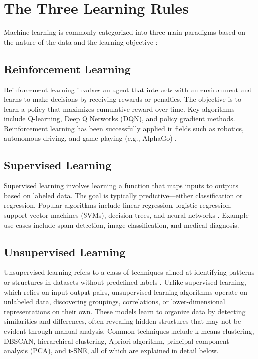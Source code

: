 \documentclass[conference]{IEEEtran}
\begin{document}
\section{The Three Learning Rules}
Machine learning is commonly categorized into three main paradigms based on the nature of the data and the learning objective \cite{unsupervised}: 

\subsection{Reinforcement Learning}
Reinforcement learning involves an agent that interacts with an environment and learns to make decisions by receiving rewards or penalties. The objective is to learn a policy that maximizes cumulative reward over time. Key algorithms include Q-learning, Deep Q Networks (DQN), and policy gradient methods. Reinforcement learning has been successfully applied in fields such as robotics, autonomous driving, and game playing (e.g., AlphaGo) \cite{Hui_2018}.

\subsection{Supervised Learning}
Supervised learning involves learning a function that maps inputs to outputs based on labeled data. The goal is typically predictive—either classification or regression. Popular algorithms include linear regression, logistic regression, support vector machines (SVMs), decision trees, and neural networks \cite{supervised}. Example use cases include spam detection, image classification, and medical diagnosis.

\subsection{Unsupervised Learning}
Unsupervised learning refers to a class of techniques aimed at identifying patterns or structures in datasets without predefined labels \cite{unsupervised}. Unlike supervised learning, which relies on input-output pairs, unsupervised learning algorithms operate on unlabeled data, discovering groupings, correlations, or lower-dimensional representations on their own. These models learn to organize data by detecting similarities and differences, often revealing hidden structures that may not be evident through manual analysis. Common techniques include k-means clustering, DBSCAN, hierarchical clustering, Apriori algorithm, principal component analysis (PCA), and t-SNE, all of which are explained in detail below. 
\end{document}
